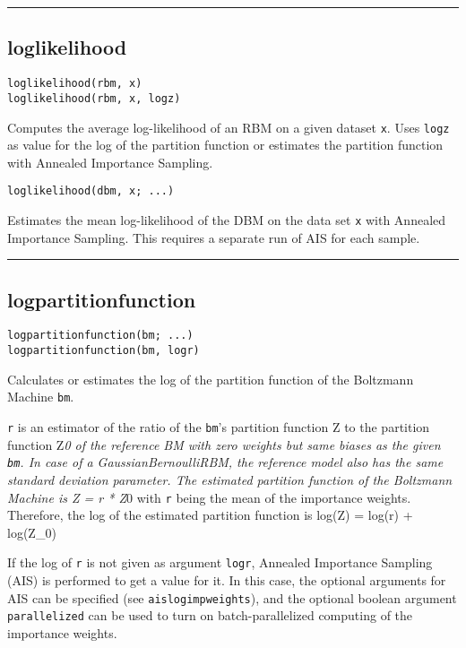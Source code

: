 \noindent\rule{\textwidth}{1pt}
\subsection*{loglikelihood}  \label{bms_loglikelihood}
\begin{verbatim}
loglikelihood(rbm, x)
loglikelihood(rbm, x, logz)
\end{verbatim}
Computes the average log-likelihood of an RBM on a given dataset \texttt{x}. Uses \texttt{logz} as value for the log of the partition function or estimates the partition function with Annealed Importance Sampling.

\begin{verbatim}
loglikelihood(dbm, x; ...)
\end{verbatim}
Estimates the mean log-likelihood of the DBM on the data set \texttt{x} with Annealed Importance Sampling. This requires a separate run of AIS for each sample.

\noindent\rule{\textwidth}{1pt}
\subsection*{logpartitionfunction}  \label{bms_logpartitionfunction}
\begin{verbatim}
logpartitionfunction(bm; ...)
logpartitionfunction(bm, logr)
\end{verbatim}
Calculates or estimates the log of the partition function of the Boltzmann Machine \texttt{bm}.

\texttt{r} is an estimator of the ratio of the \texttt{bm}'s partition function Z to the partition function Z\emph{0 of the reference BM with zero weights but same biases as the given \texttt{bm}. In case of a GaussianBernoulliRBM, the reference model also has the same standard deviation parameter. The estimated partition function of the Boltzmann Machine is Z = r * Z}0 with \texttt{r} being the mean of the importance weights. Therefore, the log of the estimated partition function is log(Z) = log(r) + log(Z\_0)

If the log of \texttt{r} is not given as argument \texttt{logr}, Annealed Importance Sampling (AIS) is performed to get a value for it. In this case, the optional arguments for AIS can be specified (see \texttt{aislogimpweights}), and the optional boolean argument \texttt{parallelized} can be used to turn on batch-parallelized computing of the importance weights.

